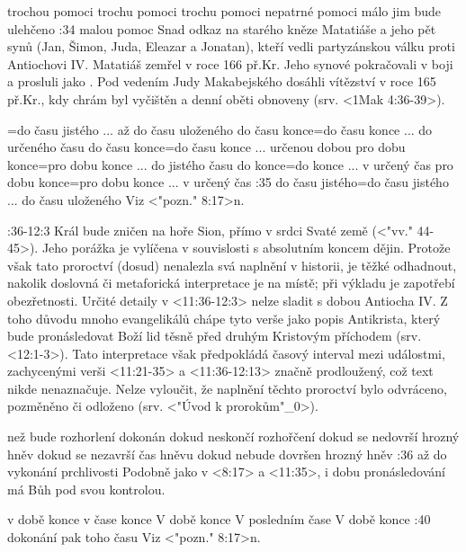    {trochou pomoci}   %
   {trochu pomoci}   %
   {trochu pomoci}   %
   {nepatrné pomoci}   %
   {málo jim bude ulehčeno}   %
:34 {malou pomoc}  Snad odkaz na starého kněze Matatiáše a jeho pět synů (Jan, Šimon, Juda, Eleazar a Jonatan), kteří vedli partyzánskou válku proti Antiochovi IV. Matatiáš zemřel v roce 166 př.Kr. Jeho synové pokračovali v boji a prosluli jako . Pod vedením Judy Makabejského dosáhli vítězství v roce 165 př.Kr., kdy chrám byl vyčištěn a denní oběti obnoveny (srv. <1Mak 4:36-39>).

={do času jistého ... až do času uloženého}   %
    {do času konce}={do času konce ... do určeného času}   %
    {do času konce}={do času konce ... určenou dobou}   %
    {pro dobu konce}={pro dobu konce ... do jistého času}   %
    {do konce}={do konce ... v určený čas}   %
    {pro dobu konce}={pro dobu konce ... v určený čas}   %
:35 {do času jistého}={do času jistého ... do času uloženého}  
    Viz <"pozn." 8:17>n.
    

:36-12:3 {}
    Král bude zničen na hoře Sion, přímo v srdci Svaté země (<"vv." 44-45>).  
    Jeho porážka je vylíčena v souvislosti s absolutním koncem dějin.
    Protože však tato proroctví (dosud)  nenalezla svá naplnění v historii, je těžké odhadnout, nakolik doslovná či metaforická interpretace je na místě; při  výkladu je zapotřebí obezřetnosti. 
    Určité detaily v <11:36-12:3> nelze sladit s dobou Antiocha IV.
    Z toho důvodu mnoho evangelikálů chápe tyto verše jako popis Antikrista, který bude pronásledovat Boží lid těsně před druhým Kristovým příchodem (srv. <12:1-3>). Tato interpretace však předpokládá  časový interval mezi událostmi, zachycenými  verši <11:21-35> a  <11:36-12:13> značně prodloužený, což  text nikde nenaznačuje.
    Nelze vyloučit, že naplnění těchto proroctví bylo odvráceno,  pozměněno či odloženo (srv. <"Úvod k prorokům"_0>).
    
    

    {než bude rozhorlení dokonán}   %
    {dokud neskončí rozhořčení}   %
    {dokud se nedovrší hrozný hněv}   %
    {dokud se nezavrší čas hněvu}  %
    {dokud nebude dovršen hrozný hněv}   %
:36 {až do vykonání prchlivosti}  
    Podobně jako v <8:17> a <11:35>, i dobu pronásledování má Bůh pod svou kontrolou.


    {v době konce}   %
    {v čase konce}   %
    {V době konce}   %
    {V posledním čase}   %
    {V době konce}   %
:40 {dokonání pak toho času}  
    Viz <"pozn." 8:17>n.


